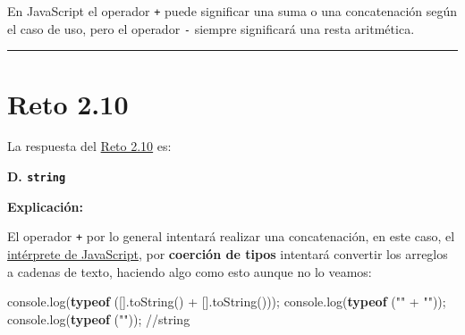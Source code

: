 \documentclass[
  letterpaper,
  DIV=11,
  numbers=noendperiod]{scrreprt}
\newenvironment{Shaded}{\begin{snugshade}}{\end{snugshade}}
\newcommand{\BuiltInTok}[1]{\textcolor[rgb]{0.00,0.23,0.31}{#1}}
\newcommand{\CommentTok}[1]{\textcolor[rgb]{0.37,0.37,0.37}{#1}}
\newcommand{\FunctionTok}[1]{\textcolor[rgb]{0.28,0.35,0.67}{#1}}
\newcommand{\KeywordTok}[1]{\textcolor[rgb]{0.00,0.23,0.31}{\textbf{#1}}}
\newcommand{\NormalTok}[1]{\textcolor[rgb]{0.00,0.23,0.31}{#1}}
\newcommand{\OperatorTok}[1]{\textcolor[rgb]{0.37,0.37,0.37}{#1}}
\newcommand{\StringTok}[1]{\textcolor[rgb]{0.13,0.47,0.30}{#1}}
\begin{document}
\begin{tcolorbox}[enhanced jigsaw, left=2mm, toprule=.15mm, leftrule=.75mm, breakable, colback=white, coltitle=black, bottomtitle=1mm, arc=.35mm, rightrule=.15mm, colframe=quarto-callout-tip-color-frame, opacitybacktitle=0.6, toptitle=1mm, opacityback=0, titlerule=0mm, title=\textcolor{quarto-callout-tip-color}{\faLightbulb}\hspace{0.5em}{Tip}, bottomrule=.15mm, colbacktitle=quarto-callout-tip-color!10!white]

En JavaScript el operador \texttt{+} puede significar una suma o una
concatenación según el caso de uso, pero el operador \texttt{-} siempre
significará una resta aritmética.

\end{tcolorbox}

\begin{center}\rule{0.5\linewidth}{0.5pt}\end{center}

\section{Reto 2.10}\label{sec-sol-cap2-reto10}

La respuesta del \hyperref[sec-cap2-reto10]{Reto 2.10} es:

\textbf{D. \texttt{string}}

\textbf{Explicación:}

El operador \texttt{+} por lo general intentará realizar una
concatenación, en este caso, el \hyperref[glos-interpreter]{intérprete
de JavaScript}, por \textbf{coerción de tipos} intentará convertir los
arreglos a cadenas de texto, haciendo algo como esto aunque no lo
veamos:

\begin{Shaded}
\begin{Highlighting}[]
\BuiltInTok{console}\OperatorTok{.}\FunctionTok{log}\NormalTok{(}\KeywordTok{typeof}\NormalTok{ ([]}\OperatorTok{.}\FunctionTok{toString}\NormalTok{() }\OperatorTok{+}\NormalTok{ []}\OperatorTok{.}\FunctionTok{toString}\NormalTok{()))}\OperatorTok{;} 
\BuiltInTok{console}\OperatorTok{.}\FunctionTok{log}\NormalTok{(}\KeywordTok{typeof}\NormalTok{ (}\StringTok{""} \OperatorTok{+} \StringTok{""}\NormalTok{))}\OperatorTok{;}
\BuiltInTok{console}\OperatorTok{.}\FunctionTok{log}\NormalTok{(}\KeywordTok{typeof}\NormalTok{ (}\StringTok{""}\NormalTok{))}\OperatorTok{;} \CommentTok{//string}
\end{Highlighting}
\end{Shaded}
\end{document}
